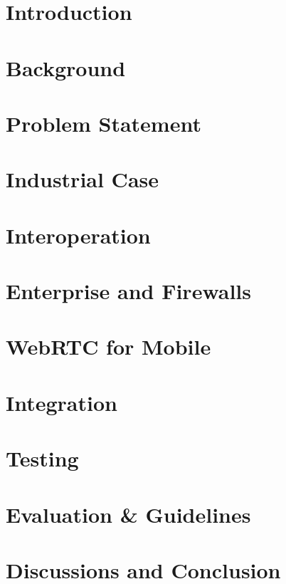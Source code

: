 \chapter{Introduction}


\chapter{Background}


%

\chapter{Problem Statement}


\chapter{Industrial Case}


\chapter{Interoperation}


\chapter{Enterprise and Firewalls}


\chapter{WebRTC for Mobile}


\chapter{Integration}


\chapter{Testing}
%

\chapter{Evaluation \& Guidelines}


\chapter{Discussions and Conclusion}
